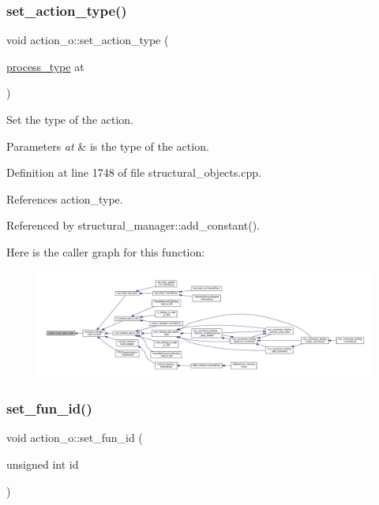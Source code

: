 \subsubsection{\texorpdfstring{set\+\_\+action\+\_\+type()}{set\_action\_type()}}
{\footnotesize\ttfamily void action\+\_\+o\+::set\+\_\+action\+\_\+type (\begin{DoxyParamCaption}\item[{\hyperlink{classaction__o_a72fdfe1ad9ac24109fe11bb41153b87b}{process\+\_\+type}}]{at }\end{DoxyParamCaption})}



Set the type of the action. 


\begin{DoxyParams}{Parameters}
{\em at} & is the type of the action. \\
\hline
\end{DoxyParams}


Definition at line 1748 of file structural\+\_\+objects.\+cpp.



References action\+\_\+type.



Referenced by structural\+\_\+manager\+::add\+\_\+constant().

Here is the caller graph for this function\+:
\nopagebreak
\begin{figure}[H]
\begin{center}
\leavevmode
\includegraphics[width=350pt]{d2/ded/classaction__o_af5e89b242d1180d219eea85b3c49b4a1_icgraph}
\end{center}
\end{figure}
\mbox{\label{classaction__o_ad66c6ac5bcb4cbdb45e0a84062b58aee}} 
\subsubsection{\texorpdfstring{set\+\_\+fun\+\_\+id()}{set\_fun\_id()}}
{\footnotesize\ttfamily void action\+\_\+o\+::set\+\_\+fun\+\_\+id (\begin{DoxyParamCaption}\item[{unsigned int}]{id }\end{DoxyParamCaption})}



